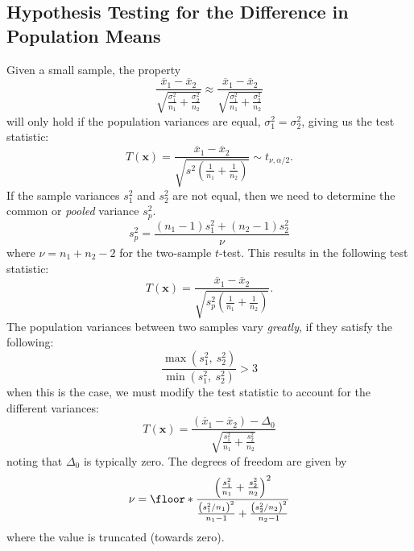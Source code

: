 \documentclass{article}
\begin{document}
\subsection{Hypothesis Testing for the Difference in Population Means}
Given a small sample, the property
\begin{equation*}
    \frac{\overline{x}_1 - \overline{x}_2}{\sqrt{\frac{\sigma_1^2}{n_1} + \frac{\sigma_2^2}{n_2}}} \approx \frac{\overline{x}_1 - \overline{x}_2}{\sqrt{\frac{\sigma_1^2}{n_1} + \frac{\sigma_2^2}{n_2}}}
\end{equation*}
will only hold if the population variances are equal, \(\sigma_1^2 = \sigma_2^2\), giving
us the test statistic:
\begin{equation*}
    T\left( \symbf{x} \right) = \frac{\overline{x}_1 - \overline{x}_2}{\sqrt{s^2\left( \frac{1}{n_1} + \frac{1}{n_2} \right)}} \sim t_{\nu, \alpha/2}.
\end{equation*}
If the sample variances \(s_1^2\) and \(s_2^2\) are not equal, then we
need to determine the common or \textit{pooled} variance \(s_p^2\).
\begin{equation*}
    s_p^2 = \frac{\left( n_1 - 1 \right)s_1^2 + \left( n_2 - 1 \right)s_2^2}{\nu}
\end{equation*}
where \(\nu = n_1 + n_2 - 2\) for the two-sample \(t\)-test. This
results in the following test statistic:
\begin{equation*}
    T\left( \symbf{x} \right) = \frac{\overline{x}_1 - \overline{x}_2}{\sqrt{s_p^2 \left( \frac{1}{n_1} + \frac{1}{n_2} \right)}}.
\end{equation*}
The population variances between two samples vary \textit{greatly}, if
they satisfy the following:
\begin{equation*}
    \frac{\max{\left( s_1^2,\: s_2^2 \right)}}{\min{\left( s_1^2,\: s_2^2 \right)}} > 3
\end{equation*}
when this is the case, we must modify the test statistic to account for
the different variances:
\begin{equation*}
    T\left( \symbf{x} \right) = \frac{\left( \overline{x}_1 - \overline{x}_2 \right) - \Delta_0}{\sqrt{\frac{s_1^2}{n_1} + \frac{s_2^2}{n_2}}}
\end{equation*}
noting that \(\Delta_0\) is typically zero. The degrees of freedom are
given by
\begin{equation*}
    \nu = \floor*{\frac{\left( \frac{s_1^2}{n_1} + \frac{s_2^2}{n_2} \right)^2}{\frac{\left( s_1^2 / n_1 \right)^2}{n_1 - 1} + \frac{\left( s_2^2 / n_2 \right)^2}{n_2 - 1}}}
\end{equation*}
where the value is truncated (towards zero).
\end{document}
